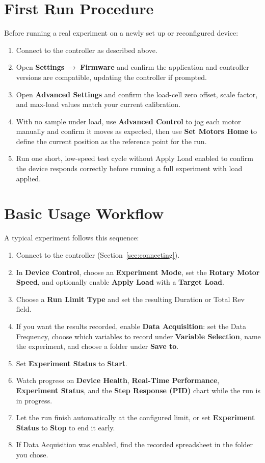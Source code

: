 \documentclass[12pt]{report}
\begin{document}
\section{First Run Procedure}
Before running a real experiment on a newly set up or reconfigured device:
\begin{enumerate}
    \item Connect to the controller as described above.
    \item Open \textbf{Settings} $\rightarrow$ \textbf{Firmware} and confirm the application and controller versions are compatible, updating the controller if prompted.
    \item Open \textbf{Advanced Settings} and confirm the load-cell zero offset, scale factor, and max-load values match your current calibration.
    \item With no sample under load, use \textbf{Advanced Control} to jog each motor manually and confirm it moves as expected, then use \textbf{Set Motors Home} to define the current position as the reference point for the run.
    \item Run one short, low-speed test cycle without Apply Load enabled to confirm the device responds correctly before running a full experiment with load applied.
\end{enumerate}

\section{Basic Usage Workflow}
A typical experiment follows this sequence:
\begin{enumerate}
    \item Connect to the controller (Section~\ref{sec:connecting}).
    \item In \textbf{Device Control}, choose an \textbf{Experiment Mode}, set the \textbf{Rotary Motor Speed}, and optionally enable \textbf{Apply Load} with a \textbf{Target Load}.
    \item Choose a \textbf{Run Limit Type} and set the resulting Duration or Total Rev field.
    \item If you want the results recorded, enable \textbf{Data Acquisition}: set the Data Frequency, choose which variables to record under \textbf{Variable Selection}, name the experiment, and choose a folder under \textbf{Save to}.
    \item Set \textbf{Experiment Status} to \textbf{Start}.
    \item Watch progress on \textbf{Device Health}, \textbf{Real-Time Performance}, \textbf{Experiment Status}, and the \textbf{Step Response (PID)} chart while the run is in progress.
    \item Let the run finish automatically at the configured limit, or set \textbf{Experiment Status} to \textbf{Stop} to end it early.
    \item If Data Acquisition was enabled, find the recorded spreadsheet in the folder you chose.
\end{enumerate}
\end{document}
